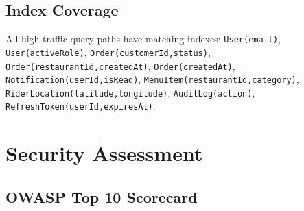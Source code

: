 \documentclass[11pt,a4paper]{article}
\begin{document}
\subsection{Index Coverage}

All high-traffic query paths have matching indexes: \texttt{User(email)},
\texttt{User(activeRole)}, \texttt{Order(customerId,status)},
\texttt{Order(restaurantId,createdAt)}, \texttt{Order(createdAt)},
\texttt{Notification(userId,isRead)}, \texttt{MenuItem(restaurantId,category)},
\texttt{RiderLocation(latitude,longitude)}, \texttt{AuditLog(action)},
\texttt{RefreshToken(userId,expiresAt)}.

\section{Security Assessment}

\subsection{OWASP Top 10 Scorecard}
\end{document}
